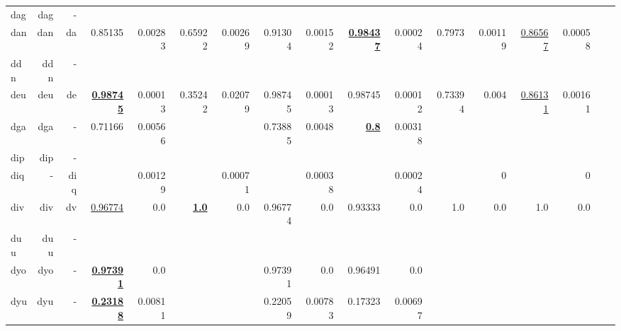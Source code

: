 \documentclass[11pt]{article}
\begin{document}
\begin{table*}[h]
{\begin{tabular}{lrrrrrrrrrrrrrrrr}
dag         & dag         & -         &          &          &          &          &          &          &          &          &          &          &          &          \\
dan         & dan         & da         & 0.85135         & 0.00283         & 0.65922         & 0.00269         & 0.91304         & 0.00152         & \textbf{\underline{0.98437}}         & 0.00024         & 0.7973         & 0.00119         & \underline{0.86567}         & 0.00058         \\
ddn         & ddn         & -         &          &          &          &          &          &          &          &          &          &          &          &          \\
deu         & deu         & de         & \textbf{\underline{0.98745}}         & 0.00013         & 0.35242         & 0.02079         & 0.98745         & 0.00013         & 0.98745         & 0.00012         & 0.73394         & 0.004         & \underline{0.86131}         & 0.00161         \\
dga         & dga         & -         & 0.71166         & 0.00566         &          &          & 0.73885         & 0.0048         & \textbf{\underline{0.8}}         & 0.00318         &          &          &          &          \\
dip         & dip         & -         &          &          &          &          &          &          &          &          &          &          &          &          \\
diq         & -         & diq         &          & 0.00129         &          & 0.00071         &          & 0.00038         &          & 0.00024         &          & 0         &          & 0         \\
div         & div         & dv         & \underline{0.96774}         & 0.0         & \textbf{\underline{1.0}}         & 0.0         & 0.96774         & 0.0         & 0.93333         & 0.0         & 1.0         & 0.0         & 1.0         & 0.0         \\
duu         & duu         & -         &          &          &          &          &          &          &          &          &          &          &          &          \\
dyo         & dyo         & -         & \textbf{\underline{0.97391}}         & 0.0         &          &          & 0.97391         & 0.0         & 0.96491         & 0.0         &          &          &          &          \\
dyu         & dyu         & -         & \textbf{\underline{0.23188}}         & 0.00811         &          &          & 0.22059         & 0.00783         & 0.17323         & 0.00697         &          &          &          &          \\

\end{tabular}}
\end{table*}
\end{document}
